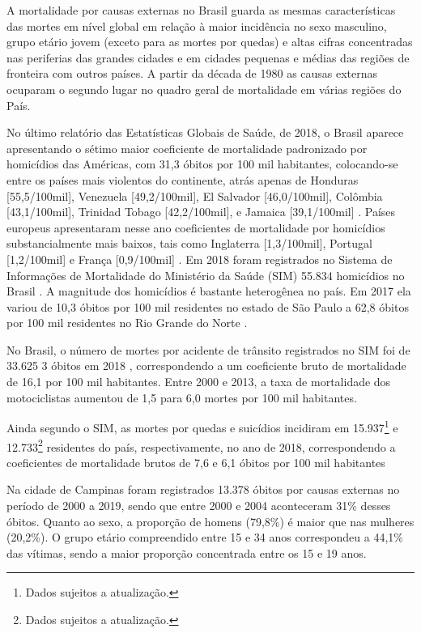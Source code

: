 A mortalidade por causas externas no Brasil guarda as mesmas características das mortes em nível global em relação à maior incidência no sexo masculino, grupo etário jovem (exceto para as mortes por quedas) e altas cifras concentradas nas periferias das grandes cidades e em cidades pequenas e médias das regiões de fronteira com outros países. A partir da década de 1980 as causas externas ocuparam o segundo lugar no quadro geral de mortalidade em várias regiões do País.

No último relatório das Estatísticas Globais de Saúde, de 2018, o Brasil aparece apresentando o sétimo maior coeficiente de mortalidade padronizado por homicídios das Américas, com 31,3 óbitos por 100 mil habitantes, colocando-se entre os países mais violentos do continente, atrás apenas de Honduras [55,5/100mil], Venezuela [49,2/100mil], El Salvador [46,0/100mil], Colômbia [43,1/100mil], Trinidad Tobago [42,2/100mil], e Jamaica [39,1/100mil] \citep{world2018world}. Países europeus apresentaram nesse ano coeficientes de mortalidade por homicídios substancialmente mais baixos, tais como Inglaterra [1,3/100mil], Portugal [1,2/100mil] e França [0,9/100mil] \citep{world2018world}. Em 2018 foram registrados no Sistema de Informações de Mortalidade do Ministério da Saúde (SIM) 55.834 homicídios no Brasil \citep{DataSUS2020}. A magnitude dos homicídios é bastante heterogênea no país. Em 2017 ela variou de 10,3 óbitos por 100 mil residentes no estado de São Paulo a 62,8 óbitos por 100 mil residentes no Rio Grande do Norte \citep{cerqueira2019atlas}.

No Brasil, o número de mortes por acidente de trânsito registrados no SIM foi de 33.625 3 óbitos em 2018 \citep{DataSUS2020}, correspondendo a um coeficiente bruto de mortalidade de 16,1 por 100 mil habitantes. Entre 2000 e 2013, a taxa de mortalidade dos motociclistas aumentou de 1,5 para 6,0 mortes por 100 mil habitantes\citep{brasil2015saude}.

Ainda segundo o SIM, as mortes por quedas e suicídios incidiram em 15.937\footnote{Dados sujeitos a atualização.} e 12.733\footnote{Dados sujeitos a atualização.} residentes do país, respectivamente, no ano de 2018, correspondendo a coeficientes de mortalidade brutos de 7,6 e 6,1 óbitos por 100 mil habitantes

Na cidade de Campinas foram registrados 13.378 óbitos por causas externas no período de 2000 a 2019, sendo que entre 2000 e 2004 aconteceram 31\% desses óbitos. Quanto ao sexo, a proporção de homens (79,8\%) é maior que nas mulheres (20,2\%). O grupo etário compreendido entre 15 e 34 anos correspondeu a 44,1\% das vítimas, sendo a maior proporção concentrada entre os 15 e 19 anos.

